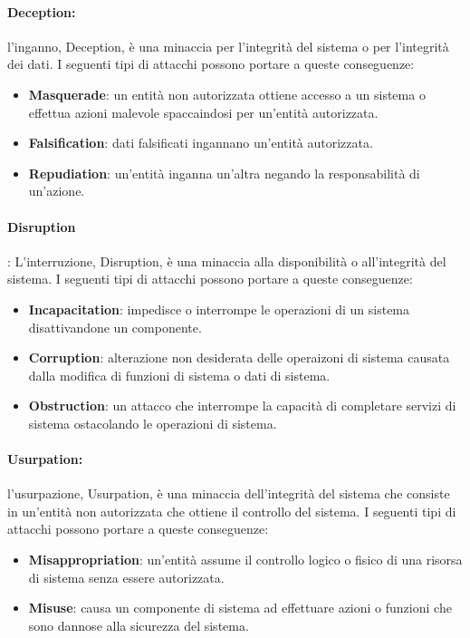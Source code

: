 \paragraph{Deception: } l'inganno, Deception, è una minaccia per l'integrità
del sistema o per l'integrità dei dati.
I seguenti tipi di attacchi possono portare a queste conseguenze:

\begin{itemize}
      \item \textbf{Masquerade}: un entità non autorizzata ottiene accesso a un sistema
            o effettua azioni malevole spaccaindosi per un'entità autorizzata.
      \item \textbf{Falsification}: dati falsificati ingannano un'entità autorizzata.
      \item \textbf{Repudiation}: un'entità inganna un'altra negando la responsabilità
            di un'azione.
\end{itemize}

\paragraph{Disruption}: L'interruzione, Disruption, è una minaccia alla
disponibilità o all'integrità del sistema.
I seguenti tipi di attacchi possono portare a queste conseguenze:

\begin{itemize}
      \item \textbf{Incapacitation}: impedisce o interrompe le operazioni di un sistema
            disattivandone un componente.
      \item \textbf{Corruption}: alterazione non desiderata delle operaizoni di
            sistema causata dalla modifica di funzioni di sistema o dati di sistema.
      \item \textbf{Obstruction}: un attacco che interrompe la capacità di
            completare servizi di sistema ostacolando le operazioni di sistema.
\end{itemize}

\paragraph{Usurpation: } l'usurpazione, Usurpation, è una minaccia dell'integrità
del sistema che consiste in un'entità non autorizzata che ottiene il controllo
del sistema.
I seguenti tipi di attacchi possono portare a queste conseguenze:

\begin{itemize}
      \item \textbf{Misappropriation}: un'entità assume il controllo logico o fisico
            di una risorsa di sistema senza essere autorizzata.
      \item \textbf{Misuse}: causa un componente di sistema ad effettuare azioni o
            funzioni che sono dannose alla sicurezza del sistema.
\end{itemize}

